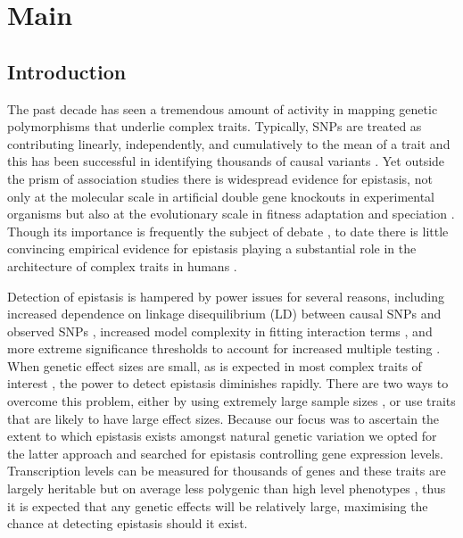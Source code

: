 \documentclass{article}
\begin{document}
\section{Main}

\subsection{Introduction}
The past decade has seen a tremendous amount of activity in mapping genetic polymorphisms that underlie complex traits. Typically, SNPs are treated as contributing linearly, independently, and cumulatively to the mean of a trait and this has been successful in identifying thousands of causal variants \cite{Hindorff2010, Visscher2012}. Yet outside the prism of association studies there is widespread evidence for epistasis, not only at the molecular scale in artificial double gene knockouts in experimental organisms \cite{Costanzo2010} but also at the evolutionary scale in fitness adaptation \cite{Weinreich2006} and speciation \cite{Breen2012}. Though its importance is frequently the subject of debate \cite{Phillips1998, Carlborg2004, Hill2008a, Crow2010}, to date there is little convincing empirical evidence for epistasis playing a substantial role in the architecture of complex traits in humans \cite{Strange2010, Evans2011}.

Detection of epistasis is hampered by power issues for several reasons, including increased dependence on linkage disequilibrium (LD) between causal SNPs and observed SNPs \cite{Weir2008, Hemani2013}, increased model complexity in fitting interaction terms \cite{Marchini2005}, and more extreme significance thresholds to account for increased multiple testing \cite{Cordell2002}. When genetic effect sizes are small, as is expected in most complex traits of interest \cite{Yang2011}, the power to detect epistasis diminishes rapidly. There are two ways to overcome this problem, either by using extremely large sample sizes \cite{LangoAllen2010}, or use traits that are likely to have large effect sizes. Because our focus was to ascertain the extent to which epistasis exists amongst natural genetic variation we opted for the latter approach and searched for epistasis controlling gene expression levels. Transcription levels can be measured for thousands of genes and these traits are largely heritable but on average less polygenic than high level phenotypes \cite{Powell2013}, thus it is expected that any genetic effects will be relatively large, maximising the chance at detecting epistasis should it exist.
\end{document}
